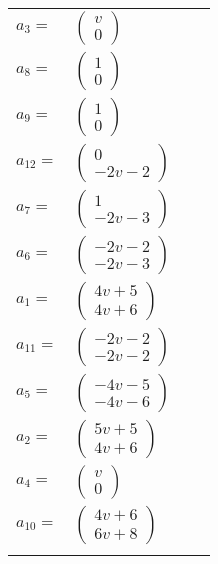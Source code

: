 \documentclass[1p]{elsarticle_modified}
\theoremstyle{definition}
\begin{document}
\begin{tabular}{m{7pt} m{180pt} m{7pt} m{180pt} }
\flushright $a_{3}=$&$\begin{pmatrix}v\\0\end{pmatrix}$ \\
\flushright $a_{8}=$&$\begin{pmatrix}1\\0\end{pmatrix}$ \\
\flushright $a_{9}=$&$\begin{pmatrix}1\\0\end{pmatrix}$ \\
\flushright $a_{12}=$&$\begin{pmatrix}0\\-2 v-2\end{pmatrix}$ \\
\flushright $a_{7}=$&$\begin{pmatrix}1\\-2 v-3\end{pmatrix}$ \\
\flushright $a_{6}=$&$\begin{pmatrix}-2 v-2\\-2 v-3\end{pmatrix}$ \\
\flushright $a_{1}=$&$\begin{pmatrix}4 v+5\\4 v+6\end{pmatrix}$ \\
\flushright $a_{11}=$&$\begin{pmatrix}-2 v-2\\-2 v-2\end{pmatrix}$ \\
\flushright $a_{5}=$&$\begin{pmatrix}-4 v-5\\-4 v-6\end{pmatrix}$ \\
\flushright $a_{2}=$&$\begin{pmatrix}5 v+5\\4 v+6\end{pmatrix}$ \\
\flushright $a_{4}=$&$\begin{pmatrix}v\\0\end{pmatrix}$ \\
\flushright $a_{10}=$&$\begin{pmatrix}4 v+6\\6 v+8\end{pmatrix}$\\&\end{tabular}
\end{document}
